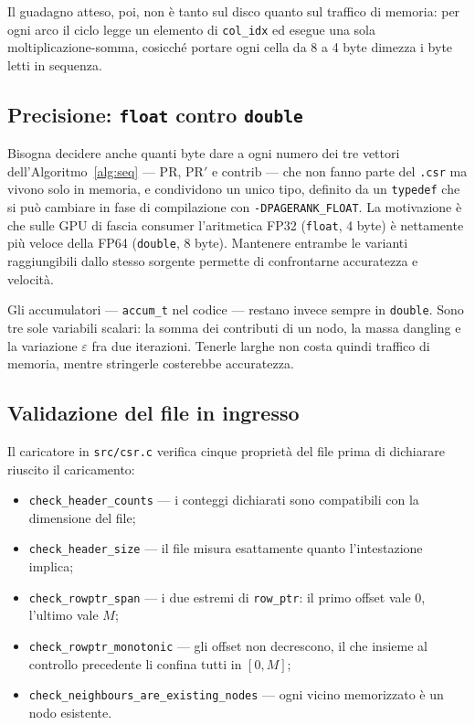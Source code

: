 \documentclass[11pt,a4paper]{article}
\newcommand{\stacco}{\par\medskip\noindent}
\begin{document}
\stacco
Il guadagno atteso, poi, non è tanto sul disco quanto sul traffico di memoria:
per ogni arco il ciclo legge un elemento di \texttt{col\_idx} ed esegue una
sola moltiplicazione-somma, cosicché portare ogni cella da 8 a 4 byte dimezza
i byte letti in sequenza.

\subsection{Precisione: \texttt{float} contro \texttt{double}}
\label{sec:precisione}
Bisogna decidere anche quanti byte dare a ogni numero dei tre vettori
dell'Algoritmo~\ref{alg:seq} --- $\mathrm{PR}$, $\mathrm{PR}'$ e
$\mathrm{contrib}$ --- che non fanno parte del \texttt{.csr} ma vivono solo in
memoria, e condividono un unico tipo, definito da un \texttt{typedef} che si
può cambiare in fase di compilazione con \texttt{-DPAGERANK\_FLOAT}. La
motivazione è che sulle GPU di fascia consumer
l'aritmetica FP32 (\texttt{float}, 4 byte) è nettamente più veloce della FP64
(\texttt{double}, 8 byte). Mantenere entrambe le varianti raggiungibili dallo stesso
sorgente permette di confrontarne accuratezza e velocità.

Gli accumulatori --- \texttt{accum\_t} nel codice --- restano invece sempre in
\texttt{double}. Sono tre sole variabili scalari: la somma dei contributi di
un nodo, la massa dangling e la variazione $\varepsilon$ fra due iterazioni.
Tenerle larghe non costa quindi traffico di memoria, mentre stringerle
costerebbe accuratezza.

\subsection{Validazione del file in ingresso}
\label{sec:validazione}
Il caricatore in \texttt{src/csr.c} verifica cinque proprietà del file
prima di dichiarare riuscito il caricamento:
\begin{itemize}\itemsep2pt
  \item \texttt{check\_header\_counts} --- i conteggi dichiarati sono
    compatibili con la dimensione del file;
  \item \texttt{check\_header\_size} --- il file misura esattamente quanto
    l'intestazione implica;
  \item \texttt{check\_rowptr\_span} --- i due estremi di \texttt{row\_ptr}:
    il primo offset vale 0, l'ultimo vale $M$;
  \item \texttt{check\_rowptr\_monotonic} --- gli offset non decrescono, il
    che insieme al controllo precedente li confina tutti in $[0,M]$;
  \item \texttt{check\_neighbours\_are\_existing\_nodes} --- ogni vicino
    memorizzato è un nodo esistente.
\end{itemize}
\end{document}
